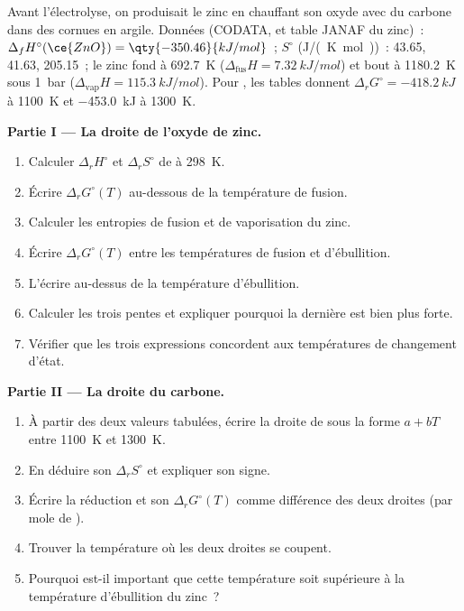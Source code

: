 \begin{problem}
\label{pb:b2:ellingham:1}
Avant l'électrolyse, on produisait le zinc en chauffant son oxyde avec du carbone dans des cornues
en argile. Données (CODATA, et table JANAF du zinc)~: $\Delta_f H^\circ(\ce{ZnO})
= \qty{-350.46}{kJ/mol}$~; $S^\circ$ (\unit{J/(K.mol)})~:  43.65, 
41.63,  205.15~; le zinc fond à \qty{692.7}{K} ($\Delta_{\text{fus}}H =
\qty{7.32}{kJ/mol}$) et bout à \qty{1180.2}{K} sous \qty{1}{bar}
($\Delta_{\text{vap}}H = \qty{115.3}{kJ/mol}$). Pour , les
tables donnent $\Delta_r G^\circ = \qty{-418.2}{kJ}$ à \qty{1100}{K} et
\qty{-453.0}{kJ} à \qty{1300}{K}.

\medskip
\noindent\textbf{Partie I --- La droite de l'oxyde de zinc.}
\begin{enumerate}
  \item Calculer $\Delta_r H^\circ$ et $\Delta_r S^\circ$ de  à \qty{298}{K}.
  \item Écrire $\Delta_r G^\circ(T)$ au-dessous de la température de fusion.
  \item Calculer les entropies de fusion et de vaporisation du zinc.
  \item Écrire $\Delta_r G^\circ(T)$ entre les températures de fusion et d'ébullition.
  \item L'écrire au-dessus de la température d'ébullition.
  \item Calculer les trois pentes et expliquer pourquoi la dernière est bien plus forte.
  \item Vérifier que les trois expressions concordent aux températures de changement d'état.
\end{enumerate}

\medskip
\noindent\textbf{Partie II --- La droite du carbone.}
\begin{enumerate}[resume]
  \item À partir des deux valeurs tabulées, écrire la droite de  sous
        la forme $a + bT$ entre \qty{1100}{K} et \qty{1300}{K}.
  \item En déduire son $\Delta_r S^\circ$ et expliquer son signe.
  \item Écrire la réduction  et son $\Delta_r
        G^\circ(T)$ comme différence des deux droites (par mole de ).
  \item Trouver la température où les deux droites se coupent.
  \item Pourquoi est-il important que cette température soit supérieure à la température d'ébullition
        du zinc~?
\end{enumerate}


\end{problem}
